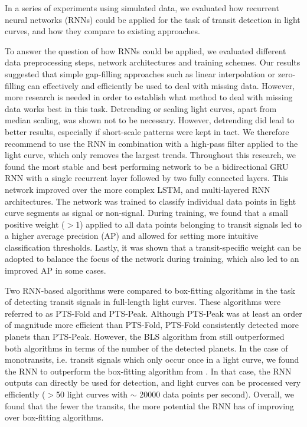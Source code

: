 
In a series of experiments using simulated data, we evaluated how recurrent neural networks (RNNs) could be applied for the task of transit detection in light curves, and how they compare to existing approaches. 

To answer the question of how RNNs could be applied, we evaluated different data preprocessing steps, network architectures and training schemes. Our results suggested that simple gap-filling approaches such as linear interpolation or zero-filling can effectively and efficiently be used to deal with missing data. However, more research is needed in order to establish what method to deal with missing data works best in this task. Detrending or scaling light curves, apart from median scaling, was shown not to be necessary. However, detrending did lead to better results, especially if short-scale patterns were kept in tact. We therefore recommend to use the RNN in combination with a high-pass filter applied to the light curve, which only removes the largest trends.  Throughout this research, we found the most stable and best performing network to be a bidirectional GRU RNN with a single recurrent layer followed by two fully connected layers. This network improved over the more complex LSTM, and multi-layered RNN architectures. The network was trained to classify individual data points in light curve segments as signal or non-signal. During training, we found that a small positive weight ($>$1) applied to all data points belonging to transit signals led to a higher average precision (AP) and allowed for setting more intuitive classification thresholds. Lastly, it was shown that a transit-specific weight can be adopted to balance the focus of the network during training, which also led to an improved AP in some cases.

Two RNN-based algorithms were compared to box-fitting algorithms in the task of detecting transit signals in full-length light curves. These algorithms were referred to as PTS-Fold and PTS-Peak. Although PTS-Peak was at least an order of magnitude more efficient than PTS-Fold, PTS-Fold consistently detected more planets than PTS-Peak. However, the BLS algorithm from \cite{kovacs2002box} still outperformed both algorithms in terms of the number of the detected planets. In the case of monotransits, i.e. transit signals which only occur once in a light curve, we found the RNN to outperform the box-fitting algorithm from \cite{foreman2016population}. In that case, the RNN outputs can directly be used for detection, and light curves can be processed very efficiently ($>$50 light curves with $\sim$ 20000 data points per second). Overall, we found that the fewer the transits, the more potential the RNN has of improving over box-fitting algorithms.

